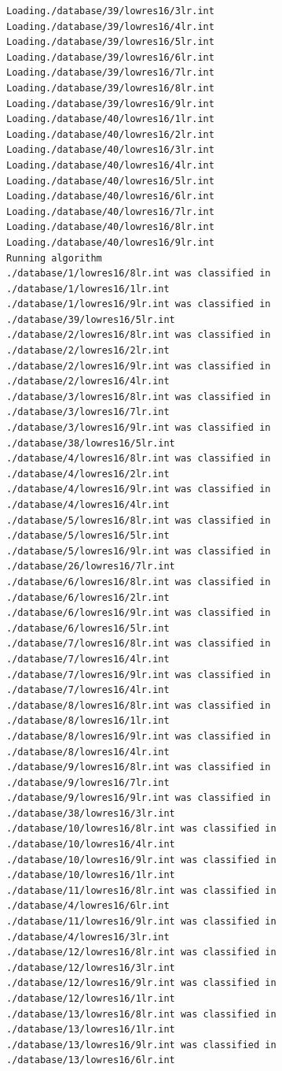 \documentclass[a4paper,11pt,titlepage]{article}
\begin{document}
\begin{verbatim}
Loading./database/39/lowres16/3lr.int
Loading./database/39/lowres16/4lr.int
Loading./database/39/lowres16/5lr.int
Loading./database/39/lowres16/6lr.int
Loading./database/39/lowres16/7lr.int
Loading./database/39/lowres16/8lr.int
Loading./database/39/lowres16/9lr.int
Loading./database/40/lowres16/1lr.int
Loading./database/40/lowres16/2lr.int
Loading./database/40/lowres16/3lr.int
Loading./database/40/lowres16/4lr.int
Loading./database/40/lowres16/5lr.int
Loading./database/40/lowres16/6lr.int
Loading./database/40/lowres16/7lr.int
Loading./database/40/lowres16/8lr.int
Loading./database/40/lowres16/9lr.int
Running algorithm
./database/1/lowres16/8lr.int was classified in ./database/1/lowres16/1lr.int
./database/1/lowres16/9lr.int was classified in ./database/39/lowres16/5lr.int
./database/2/lowres16/8lr.int was classified in ./database/2/lowres16/2lr.int
./database/2/lowres16/9lr.int was classified in ./database/2/lowres16/4lr.int
./database/3/lowres16/8lr.int was classified in ./database/3/lowres16/7lr.int
./database/3/lowres16/9lr.int was classified in ./database/38/lowres16/5lr.int
./database/4/lowres16/8lr.int was classified in ./database/4/lowres16/2lr.int
./database/4/lowres16/9lr.int was classified in ./database/4/lowres16/4lr.int
./database/5/lowres16/8lr.int was classified in ./database/5/lowres16/5lr.int
./database/5/lowres16/9lr.int was classified in ./database/26/lowres16/7lr.int
./database/6/lowres16/8lr.int was classified in ./database/6/lowres16/2lr.int
./database/6/lowres16/9lr.int was classified in ./database/6/lowres16/5lr.int
./database/7/lowres16/8lr.int was classified in ./database/7/lowres16/4lr.int
./database/7/lowres16/9lr.int was classified in ./database/7/lowres16/4lr.int
./database/8/lowres16/8lr.int was classified in ./database/8/lowres16/1lr.int
./database/8/lowres16/9lr.int was classified in ./database/8/lowres16/4lr.int
./database/9/lowres16/8lr.int was classified in ./database/9/lowres16/7lr.int
./database/9/lowres16/9lr.int was classified in ./database/38/lowres16/3lr.int
./database/10/lowres16/8lr.int was classified in ./database/10/lowres16/4lr.int
./database/10/lowres16/9lr.int was classified in ./database/10/lowres16/1lr.int
./database/11/lowres16/8lr.int was classified in ./database/4/lowres16/6lr.int
./database/11/lowres16/9lr.int was classified in ./database/4/lowres16/3lr.int
./database/12/lowres16/8lr.int was classified in ./database/12/lowres16/3lr.int
./database/12/lowres16/9lr.int was classified in ./database/12/lowres16/1lr.int
./database/13/lowres16/8lr.int was classified in ./database/13/lowres16/1lr.int
./database/13/lowres16/9lr.int was classified in ./database/13/lowres16/6lr.int

\end{verbatim}
\end{document}
